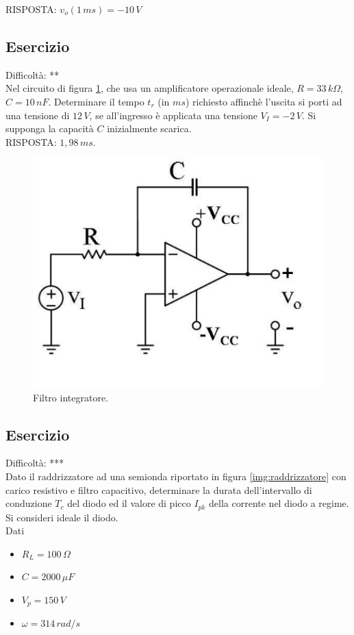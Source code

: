 \documentclass[a4paper,portrait,12pt]{article}
\theoremstyle{definition}
\begin{document}
RISPOSTA: $v_o(1\,ms) = -10\,V$


\subsection{Esercizio}

Difficoltà: **\\

Nel circuito di figura \ref{img:filtrointegratore}, che usa un amplificatore operazionale ideale, 
$R = 33\,k\Omega$, $C = 10\,nF$. Determinare il tempo $t_r$ (in $ms$) richiesto affinchè l'uscita si porti 
ad una tensione di $12\,V$, se all'ingresso è applicata una tensione $V_I = -2\,V$. Si supponga la capacità 
$C$ inizialmente scarica.\\

RISPOSTA: $1,98\,ms$.

\begin{figure}[H]
\centering
\includegraphics[width=.3\linewidth]{img/elettronicaEs/filtrointegratore.pdf}
\caption{Filtro integratore.}
\label{img:filtrointegratore}
\end{figure}


\subsection{Esercizio}

Difficoltà: ***\\

Dato il raddrizzatore ad una semionda riportato in figura \ref{img:raddrizzatore} con carico resistivo e 
filtro capacitivo, determinare la durata dell'intervallo di conduzione $T_c$ del diodo ed il valore di 
picco $I_{pk}$ della corrente nel diodo a regime. Si consideri ideale il diodo.\\

Dati
\begin{itemize}
\item $R_L=100\,\Omega$ 
\item $C=2000\,\mu F$ 
\item $V_p=150\,V$
\item $\omega = 314\,rad/s$
\end{itemize}
\end{document}
